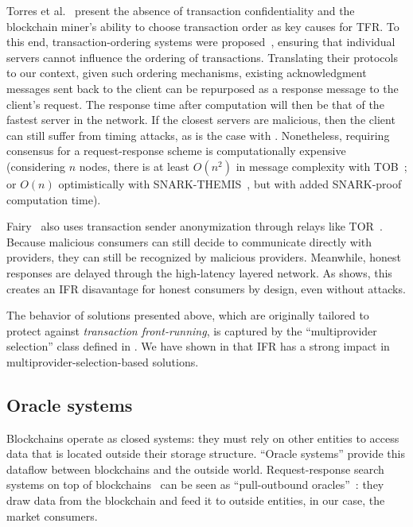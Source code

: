 Torres et al.~\cite{torresFrontrunnerJonesRaiders2021} present the absence of transaction confidentiality and the blockchain miner's ability to choose transaction order as key causes for TFR.
To this end, transaction-ordering systems were proposed~\cite{bentovTesseractRealTimeCryptocurrency2019,kelkarThemisFastStrong2023,stathakopoulouAddingFairnessOrder2021}, ensuring that individual servers cannot influence the ordering of transactions.
Translating their protocols to our context, given such ordering mechanisms, existing acknowledgment messages sent back to the client can be repurposed as a response message to the client's request.
The response time after computation will then be that of the fastest server in the network. 
If the closest servers are malicious, then the client can still suffer from timing attacks, as is the case with \sysname.
Nonetheless, requiring consensus for a request-response scheme is computationally expensive (considering $n$ nodes, there is at least $O(n^2)$ in message complexity with TOB~\cite{cachinQuickOrderFairness2022}; or $O(n)$ optimistically with SNARK-THEMIS~\cite{kelkarThemisFastStrong2023}, but with added SNARK-proof computation time).

Fairy~\cite{stathakopoulouAddingFairnessOrder2021} also uses transaction sender anonymization through relays like TOR~\cite{TorProjectPrivacy}. 
Because malicious consumers can still decide to communicate directly with providers, they can still be recognized by malicious providers.
Meanwhile, honest responses are delayed through the high-latency layered network. 
As  shows, this creates an IFR disavantage for honest consumers by design, even without attacks.

The behavior of solutions presented above, which are originally tailored to protect against \emph{transaction front-running}, is captured by the ``multiprovider selection'' class defined in .
We have shown in  that IFR has a strong impact in multiprovider-selection-based solutions.

\subsection{Oracle systems}

Blockchains operate as closed systems: they must rely on other entities to access data that is located outside their storage structure. 
``Oracle systems'' provide this dataflow between blockchains and the outside world.
Request-response search systems on top of blockchains~\cite{liBringingDecentralizedSearch2021,keizerDittoDecentralisedSimilarity2023,zichichi_towards_2021} can be seen as ``pull-outbound oracles''~\cite{muhlbergerFoundationalOraclePatterns2020}: they draw data from the blockchain and feed it to outside entities, in our case, the market consumers.

